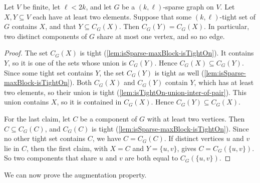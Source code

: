 \begin{lemma}
  \label{lem:isSparse-maxBlock-edge-disjoint}
  \leanok
  Let $V$ be finite, let $\ell < 2k$, and let $G$ be a
  $(k, \ell)$-sparse graph on $V$. Let $X, Y \subseteq V$ each have at
  least two elements. Suppose that some $(k, \ell)$-tight set of $G$
  contains $X$, and that $Y \subseteq C_G(X)$. Then
  $C_G(Y) = C_G(X)$. In particular, two distinct components of $G$
  share at most one vertex, and so no edge.
\end{lemma}
\begin{proof}
  \leanok
  The set $C_G(X)$ is tight (\cref{lem:isSparse-maxBlock-isTightOn}).
  It contains $Y$, so it is one of the sets whose union is $C_G(Y)$.
  Hence $C_G(X) \subseteq C_G(Y)$. Since some tight set contains $Y$,
  the set $C_G(Y)$ is tight as well
  (\cref{lem:isSparse-maxBlock-isTightOn}). Both $C_G(X)$ and $C_G(Y)$
  contain $Y$, which has at least two elements, so their union is tight
  (\cref{lem:isTightOn-union-inter-of-pair}). This union contains $X$,
  so it is contained in $C_G(X)$. Hence $C_G(Y) \subseteq C_G(X)$.

  For the last claim, let $C$ be a component of $G$ with at least two
  vertices. Then $C \subseteq C_G(C)$, and $C_G(C)$ is tight
  (\cref{lem:isSparse-maxBlock-isTightOn}). Since no other tight set
  contains $C$, we have $C = C_G(C)$. If distinct vertices $u$ and $v$
  lie in $C$, then the first claim, with $X = C$ and $Y = \{u, v\}$,
  gives $C = C_G(\{u, v\})$. So two components that share $u$ and $v$
  are both equal to $C_G(\{u, v\})$.
\end{proof}

We can now prove the augmentation property.


